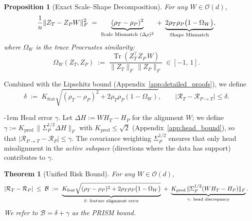 \documentclass{article} %
\makeatletter
\newtheorem{theorem}{Theorem}
\newtheorem{proposition}{Proposition}
\newlength{\paraSpace}
\renewcommand{\paragraph}{\@startsection{paragraph}{4}{\z@}%
  {\paraSpace}{-1em}%
  {\normalfont\normalsize\bfseries}}
\makeatother
\begin{document}
\begin{proposition}[Exact Scale--Shape Decomposition]
\label{prop:exact_decomposition}
For any $W \in \mathcal{O}(d)$,
\begin{equation}
\label{eq:exact_equality}
\frac{1}{n} \| Z_T - Z_P W \|_F^2
\;=\;
\underbrace{(\rho_T - \rho_P)^2}_{\text{\rm Scale Mismatch } (\Delta\rho)^2}
\;+\;
\underbrace{2 \rho_T \rho_P \big( 1 - \Omega_W \big)}_{\text{\rm Shape Mismatch}},
\end{equation}
where $\Omega_W$ is the \emph{trace Procrustes similarity}:
\begin{equation}
\label{eq:omega_def}
\Omega_W(Z_T, Z_P) \;:=\; \frac{\operatorname{Tr}(Z_T^\top Z_P\, W)}{\| Z_T \|_F\, \| Z_P \|_F} \;\in [-1,\, 1].
\end{equation}
\end{proposition}

Combined with the Lipschitz bound (Appendix~\ref{app:detailed_proofs}), we define
\begin{equation}
\label{eq:delta_bound}
\delta \;:=\; K_{\mathrm{feat}} \sqrt{(\rho_T - \rho_P)^2 + 2\rho_T \rho_P (1 - \Omega_W)}, \qquad |\mathcal{R}_T - \mathcal{R}_{P\to T}| \le \delta.
\end{equation}

\paragraph{Head error $\gamma$.}
Let $\Delta H := W H_T - H_P$ for the alignment $W$; we define $\gamma := K_{\mathrm{pred}}\,\|\Sigma_P^{1/2}\Delta H\|_F$ with $K_{\mathrm{pred}} \le \sqrt{2}$ (Appendix~\ref{app:head_bound}), so that $|\mathcal{R}_{P\to T} - \mathcal{R}_P| \le \gamma$. The covariance weighting $\Sigma_P^{1/2}$ ensures that only head misalignment in the \emph{active subspace} (directions where the data has support) contributes to $\gamma$.

\begin{theorem}[Unified Risk Bound]
\label{thm:unified_bound}
For any $W \in \mathcal{O}(d)$,
\begin{equation}
\label{eq:unified_bound}
|\mathcal{R}_T - \mathcal{R}_P| \;\le\; \mathcal{B} \;:=\; \underbrace{K_{\mathrm{feat}} \sqrt{ (\rho_T - \rho_P)^2 + 2\rho_T \rho_P \big(1 - \Omega_W\big) }}_{\delta:\ \text{\rm feature alignment error}} \;+\; \underbrace{K_{\mathrm{pred}} \,\| \Sigma_P^{1/2} (W H_T - H_P) \|_F}_{\gamma:\ \text{\rm head discrepancy}}.
\end{equation}
We refer to $\mathcal{B} = \delta + \gamma$ as the \emph{PRISM bound}.
\end{theorem}
\end{document}

